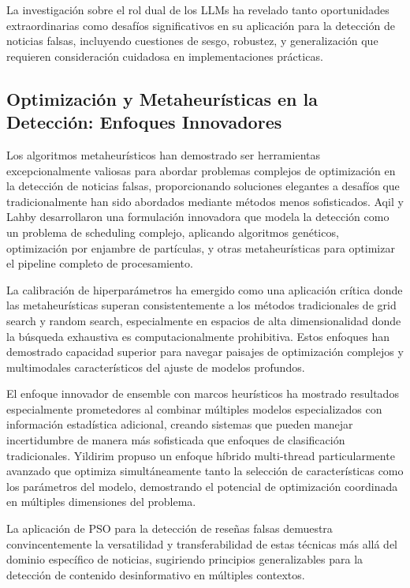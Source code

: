 La investigación sobre el rol dual de los LLMs \cite{hu2024bad, su2023adapting, su2023fake} ha revelado tanto oportunidades extraordinarias como desafíos significativos en su aplicación para la detección de noticias falsas, incluyendo cuestiones de sesgo, robustez, y generalización que requieren consideración cuidadosa en implementaciones prácticas.

\subsection{Optimización y Metaheurísticas en la Detección: Enfoques Innovadores}

Los algoritmos metaheurísticos han demostrado ser herramientas excepcionalmente valiosas para abordar problemas complejos de optimización en la detección de noticias falsas, proporcionando soluciones elegantes a desafíos que tradicionalmente han sido abordados mediante métodos menos sofisticados. Aqil y Lahby \cite{aqil2021modeling} desarrollaron una formulación innovadora que modela la detección como un problema de scheduling complejo, aplicando algoritmos genéticos, optimización por enjambre de partículas, y otras metaheurísticas para optimizar el pipeline completo de procesamiento.

La calibración de hiperparámetros \cite{bacanin2023benefits, hurtado2024calibracion} ha emergido como una aplicación crítica donde las metaheurísticas superan consistentemente a los métodos tradicionales de grid search y random search, especialmente en espacios de alta dimensionalidad donde la búsqueda exhaustiva es computacionalmente prohibitiva. Estos enfoques han demostrado capacidad superior para navegar paisajes de optimización complejos y multimodales característicos del ajuste de modelos profundos.

El enfoque innovador de ensemble con marcos heurísticos \cite{das2022heuristic} ha mostrado resultados especialmente prometedores al combinar múltiples modelos especializados con información estadística adicional, creando sistemas que pueden manejar incertidumbre de manera más sofisticada que enfoques de clasificación tradicionales. Yildirim \cite{yildirim2023novel} propuso un enfoque híbrido multi-thread particularmente avanzado que optimiza simultáneamente tanto la selección de características como los parámetros del modelo, demostrando el potencial de optimización coordinada en múltiples dimensiones del problema.

La aplicación de PSO para la detección de reseñas falsas \cite{deshai2023unmasking} demuestra convincentemente la versatilidad y transferabilidad de estas técnicas más allá del dominio específico de noticias, sugiriendo principios generalizables para la detección de contenido desinformativo en múltiples contextos.

